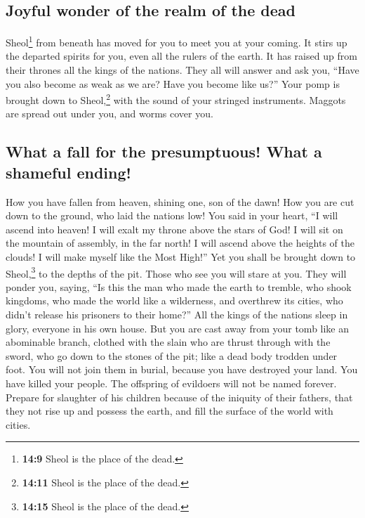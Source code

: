 \hypertarget{joyful-wonder-of-the-realm-of-the-dead}{%
\subsection{Joyful wonder of the realm of the
dead}\label{joyful-wonder-of-the-realm-of-the-dead}}

 Sheol\footnote{\textbf{14:9} Sheol is the place of the
  dead.} from beneath has moved for you to meet you at your coming. It
stirs up the departed spirits for you, even all the rulers of the earth.
It has raised up from their thrones all the kings of the nations.
 They all will answer and ask you, ``Have you also become
as weak as we are? Have you become like us?''  Your pomp
is brought down to Sheol,\footnote{\textbf{14:11} Sheol is the place of
  the dead.} with the sound of your stringed instruments. Maggots are
spread out under you, and worms cover you.

\hypertarget{what-a-fall-for-the-presumptuous-what-a-shameful-ending}{%
\subsection{What a fall for the presumptuous! What a shameful
ending!}\label{what-a-fall-for-the-presumptuous-what-a-shameful-ending}}

 How you have fallen from heaven, shining one, son of the
dawn! How you are cut down to the ground, who laid the nations low!
 You said in your heart, ``I will ascend into heaven! I
will exalt my throne above the stars of God! I will sit on the mountain
of assembly, in the far north!  I will ascend above the
heights of the clouds! I will make myself like the Most High!''
 Yet you shall be brought down to Sheol,\footnote{\textbf{14:15}
  Sheol is the place of the dead.} to the depths of the pit.
 Those who see you will stare at you. They will ponder
you, saying, ``Is this the man who made the earth to tremble, who shook
kingdoms,  who made the world like a wilderness, and
overthrew its cities, who didn't release his prisoners to their home?''
 All the kings of the nations sleep in glory, everyone in
his own house.  But you are cast away from your tomb like
an abominable branch, clothed with the slain who are thrust through with
the sword, who go down to the stones of the pit; like a dead body
trodden under foot.  You will not join them in burial,
because you have destroyed your land. You have killed your people. The
offspring of evildoers will not be named forever. 
Prepare for slaughter of his children because of the iniquity of their
fathers, that they not rise up and possess the earth, and fill the
surface of the world with cities.

